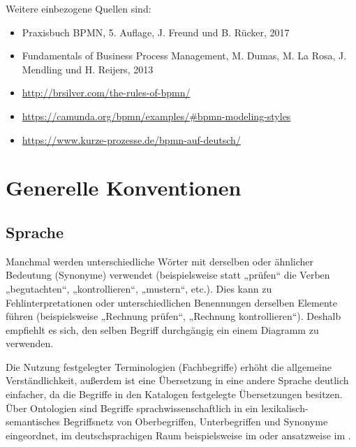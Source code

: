 \documentclass[12pt,report]{../../Templates/snetTeaching}
\begin{document}
Weitere einbezogene Quellen sind:
\begin{itemize}
\item Praxisbuch BPMN, 5. Auflage, J. Freund und B. Rücker, 2017
\item Fundamentals of Business Process Management, M. Dumas, M. La Rosa, J. Mendling und H. Reijers, 2013
\item \href{https://web.archive.org/web/20160426222746/http://brsilver.com:80/the-rules-of-bpmn/ }{http://brsilver.com/the-rules-of-bpmn/}
\item \url{https://camunda.org/bpmn/examples/#bpmn-modeling-styles}
\item \url{https://www.kurze-prozesse.de/bpmn-auf-deutsch/}
\end{itemize}





\chapter{Generelle Konventionen}


\section{Sprache}
Manchmal werden unterschiedliche Wörter mit derselben oder ähnlicher Bedeutung (Synonyme) verwendet (beispielsweise statt „prüfen“ die Verben „begutachten“, „kontrollieren“, „mustern“, etc.). Dies kann zu Fehlinterpretationen oder unterschiedlichen Benennungen derselben Elemente führen (beispielsweise „Rechnung prüfen“, „Rechnung kontrollieren“). Deshalb empfiehlt es sich, den selben Begriff durchgängig ein einem Diagramm zu verwenden.

Die Nutzung festgelegter Terminologien (Fachbegriffe) erhöht die allgemeine Verständlichkeit, außerdem ist eine Übersetzung in eine andere Sprache deutlich einfacher, da die Begriffe in den Katalogen festgelegte Übersetzungen besitzen. Über Ontologien sind Begriffe sprachwissenschaftlich in ein lexikalisch-semantisches Begriffsnetz von Oberbegriffen, Unterbegriffen und Synonyme eingeordnet, im deutschsprachigen Raum beispielsweise im  oder ansatzweise im .
\end{document}
